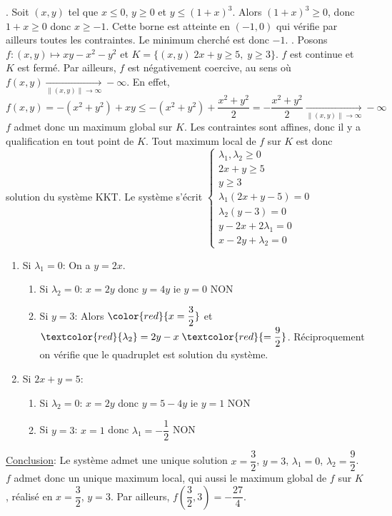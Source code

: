 \documentclass{fancybook}
\begin{document}
. Soit $(x,y)$ tel que $x\leq 0$, $y\geq 0$ et $y\leq (1+x)^3$. Alors $(1+x)^3\geq 0$, donc $1+x\geq 0$ donc $x\geq -1$. Cette borne est atteinte en $(-1,0)$ qui vérifie par ailleurs toutes les contraintes. Le minimum cherché est donc $-1$. \newline
{}. Posons $f:(x,y)\mapsto xy-x^2-y^2$ et $K=\{(x,y)\; 2x+y\geq 5, \; y\geq 3\}$. \newline
$f$ est continue et $K$ est fermé. Par ailleurs, $f$ est négativement coercive, au sens où $f(x,y)\xrightarrow[\|(x,y)\|\to \infty ]{} -\infty$. En effet, $$f(x,y)=-(x^2+y^2) + xy \leq -(x^2+y^2) + \dfrac{x^2+y^2}{2} = -\dfrac{x^2+y^2}{2}\xrightarrow[\|(x,y)\|\to \infty ]{} -\infty$$
$f$ admet donc un maximum global sur $K$.\newline
\newline
Les contraintes sont affines, donc il y a qualification en tout point de $K$. Tout maximum local de $f$ sur $K$ est donc solution du système KKT.\newline
Le système s'écrit $\begin{cases}
\lambda_1, \lambda_2 \geq 0 \\
2x+y\geq 5 \\
y\geq 3 \\
\lambda_1(2x+y-5)=0 \\
\lambda_2(y-3)=0 \\
y-2x+2\lambda_1 =0 \\
x-2y+\lambda_2=0
\end{cases}$\newline
\begin{enumerate}
\item Si $\lambda_1=0$:\newline
On a $y=2x$.
\begin{enumerate}
\item Si $\lambda_2=0$:\newline
$x=2y$ donc $y=4y$ ie $y=0$ NON
\item Si $y=3$:\newline
Alors $\color{red}{x=\dfrac 32}$ et $\textcolor{red}{\lambda_2}=2y-x\;\textcolor{red}{=\dfrac 92}$. Réciproquement on vérifie que le quadruplet est solution du système.
\end{enumerate}
\item Si $2x+y=5$:
\begin{enumerate}
\item Si $\lambda_2=0$:\newline
$x=2y$ donc $y=5-4y$ ie $y=1$ NON
\item Si $y=3$:\newline
$x=1$ donc $\lambda_1=-\dfrac 12$ NON
\end{enumerate}
\end{enumerate}
\underline{Conclusion}: Le système admet une unique solution $x=\dfrac 32$, $y=3$, $\lambda_1=0$, $\lambda_2=\dfrac 92$. $f$ admet donc un unique maximum local, qui aussi le maximum global de $f$ sur $K$, réalisé en $x=\dfrac 32$, $y=3$. Par ailleurs, $f(\dfrac 32, 3)=-\dfrac{27}4$.
\end{document}
